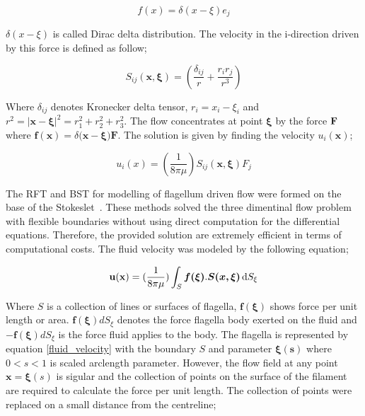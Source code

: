 \documentclass[12pt,a4paper,titlepage]{report}
\begin{document}
\begin{equation}
 f (x) = \delta (x - \xi) e_j 
\label{force}
\end{equation}

$\delta (x - \xi)$ is called Dirac delta distribution. The velocity in the i-direction driven by this force is defined
 as follow;


\begin{equation}
 S _{ij} \bm{(x , \xi)} = (\frac{\delta _{ij}}{r} + \frac{r_i r_j}{r^3})
\label{i-direction}
\end{equation}

Where $\delta _{ij}$ denotes Kronecker delta tensor, $r_i = x_i - \xi _i$ and $r^2 =| \bm{x}- \bm{\xi} |^2 = r_1 ^2 + r_2 ^ 2 + r_3 ^2$.
The flow concentrates at point $\bm \xi$ by the force $\bold F$ where $ \bm{f (x)} = \delta (\bm{x} - \bm{\xi) F}$.
The solution is given by finding the velocity $u_i(\bm x)$;

\begin{equation}
 u_i(x) =(\frac{1}{8 \pi \mu}) S_{ij}\bm{( x, \xi)} F_j
\label{velocity}
\end{equation}

The \ac*{RFT} and  \ac*{BST} for modelling of flagellum driven 
flow were formed on the base of the Stokeslet~\citep{smith2009boundary}. These methods solved the 
three dimentinal flow problem with flexible boundaries without using direct computation for the differential
equations. Therefore, the provided solution are extremely efficient in terms of computational costs. The fluid
velocity was modeled by the following equation;
   


\begin{equation}
\bold {u(x)} =(\frac{1}{8 \pi \mu}) \int_S \mathrm \bm{f(\xi)} . \bm{S( x, \xi)}\, \mathrm{d}S_{\xi}
\label{fluid_velocity}
\end{equation}

Where $S$ is a collection of lines or surfaces of flagella, $\bm{f(\xi)}$ shows force per unit length or area.
$\bm{f(\xi)} dS_{\xi}$ denotes the force flagella body exerted on the fluid and $-\bm{f(\xi)} dS_{\xi}$ is the 
force fluid applies to the body. The flagella is represented by equation \ref{fluid_velocity} with the boundary
$S$ and parameter $\bm{\xi (s)}$ where $0 < s <1$ is scaled arclength parameter. However, the flow field
at any point $\bm{x} = \bm{\xi} (s)$ is sigular and the collection of points on the surface of the filament 
are required to calculate the force per unit length. The collection of points were replaced on a small distance 
from the centreline;
\end{document}
